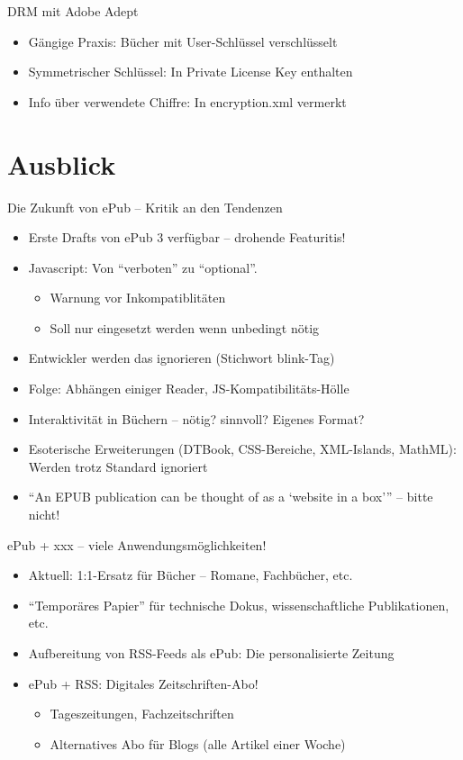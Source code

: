\documentclass[hyperref={pdfpagelabels=false}]{beamer}
\begin{document}
\begin{frame}{DRM mit Adobe Adept}
	\begin{itemize}
		\item Gängige Praxis: Bücher mit User-Schlüssel verschlüsselt
		\item Symmetrischer Schlüssel: In Private License Key enthalten
		\item Info über verwendete Chiffre: In encryption.xml vermerkt
	\end{itemize}
\end{frame}


\section{Ausblick}

\begin{frame}{Die Zukunft von ePub -- Kritik an den Tendenzen}
	\begin{itemize}
		\item Erste Drafts von ePub 3 verfügbar -- drohende Featuritis!
		\item<2-> Javascript: Von "`verboten"' zu "`optional"'. 
		\begin{itemize}
			\item Warnung vor Inkompatiblitäten
			\item Soll nur eingesetzt werden wenn unbedingt nötig
		\end{itemize}
		\item<3-> Entwickler werden das ignorieren (Stichwort blink-Tag)
		\item<3-> Folge: Abhängen einiger Reader, JS-Kompatibilitäts-Hölle
		\item<4-> Interaktivität in Büchern -- nötig? sinnvoll? Eigenes Format?
		\item<5-> Esoterische Erweiterungen (DTBook, CSS-Bereiche, XML-Islands, MathML): Werden trotz Standard ignoriert
		\item<6-> "`An EPUB publication can be thought of as a `website in a box'"' -- bitte nicht!
	\end{itemize}
\end{frame}

\begin{frame}{ePub + xxx -- viele Anwendungsmöglichkeiten!}
	\begin{itemize}
		\item Aktuell: 1:1-Ersatz für Bücher -- Romane, Fachbücher, etc.
		\item "`Temporäres Papier"' für technische Dokus, wissenschaftliche Publikationen, etc.
		\item<2-> Aufbereitung von RSS-Feeds als ePub: Die personalisierte Zeitung
		\item<3-> ePub + RSS: Digitales Zeitschriften-Abo!
		\begin{itemize}
			\item Tageszeitungen, Fachzeitschriften
			\item Alternatives Abo für Blogs (alle Artikel einer Woche)
		\end{itemize}
	\end{itemize}
\end{frame}
\end{document}
